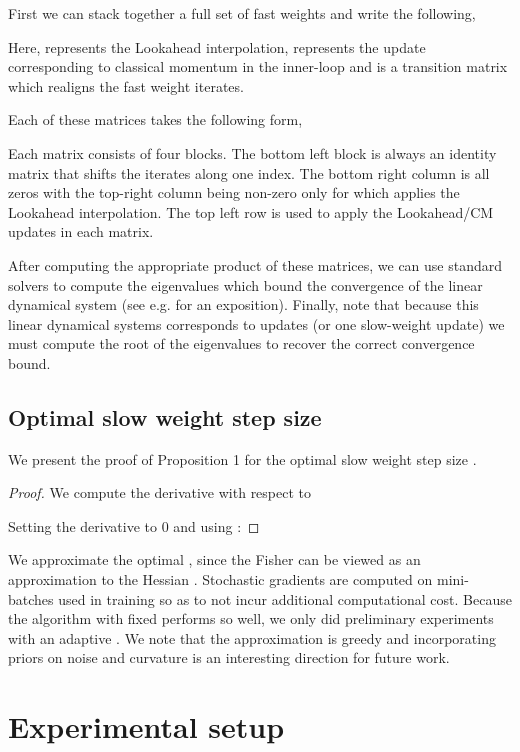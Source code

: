 \documentclass{article}
\begin{document}
First we can stack together a full set of fast weights and write the following,



Here,  represents the Lookahead interpolation,  represents the update corresponding to classical momentum in the inner-loop and  is a transition matrix which realigns the fast weight iterates.

Each of these matrices takes the following form,







Each matrix consists of four blocks. The bottom left block is always an identity matrix that shifts the iterates along one index. The bottom right column is all zeros with the top-right column being non-zero only for  which applies the Lookahead interpolation. The top left row is used to apply the Lookahead/CM updates in each matrix.

After computing the appropriate product of these matrices, we can use standard solvers to compute the eigenvalues which bound the convergence of the linear dynamical system (see e.g. \citet{lessard2016analysis} for an exposition). Finally, note that because this linear dynamical systems corresponds to  updates (or one slow-weight update) we must compute the  root of the eigenvalues to recover the correct convergence bound.

\subsection{Optimal slow weight step size}
\label{app:optimal-slow}
We present the proof of Proposition 1 for the optimal slow weight step size .

\begin{proof}
We compute the derivative with respect to  

Setting the derivative to 0 and using :

\end{proof}

We approximate the optimal , since the Fisher can be viewed as an approximation to the Hessian \cite{martens2014new}. Stochastic gradients are computed on mini-batches used in training so as to not incur additional computational cost.  Because the algorithm with fixed  performs so well, we only did preliminary experiments with an adaptive . We note that the approximation is greedy and incorporating priors on noise and curvature is an interesting direction for future work. \section{Experimental setup}
\label{app:experiments}
\end{document}
